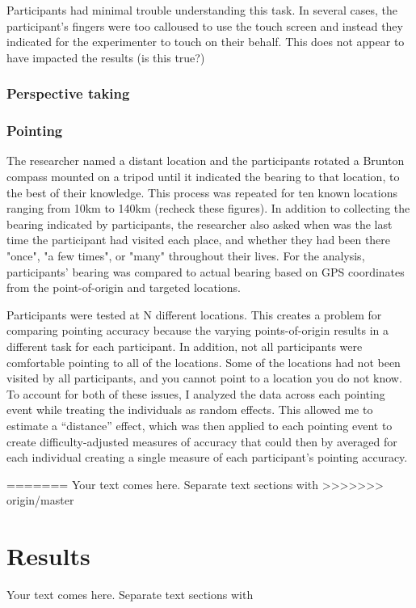 Participants had minimal trouble understanding this task.  In several cases, the participant's fingers were too calloused to use the touch screen and instead they indicated for the experimenter to touch on their behalf.  This does not appear to have impacted the results (is this true?)    

		\subsubsection{Perspective taking}
		\label{sec:2.2.3}					
		
		
		\subsubsection{Pointing}
		\label{sec:2.2.4}
The researcher named a distant location and the participants rotated a Brunton compass mounted on a tripod until it indicated the bearing to that location, to the best of their knowledge.  This process was repeated for ten known locations ranging from 10km to 140km (recheck these figures).  In addition to collecting the bearing indicated by participants, the researcher also asked when was the last time the participant had visited each place, and whether they had been there "once", "a few times", or "many" throughout their lives.  For the analysis, participants' bearing was compared to actual bearing based on GPS coordinates from the point-of-origin and targeted locations.   		

Participants were tested at N different locations.  This creates a problem for comparing pointing accuracy because the varying points-of-origin results in a different task for each participant.  In addition, not all participants were comfortable pointing to all of the locations.  Some of the locations had not been visited by all participants, and you cannot point to a location you do not know.  To account for both of these issues, I analyzed the data across each pointing event while treating the individuals as random effects.  This allowed me to estimate a ``distance'' effect, which was then applied to each pointing event to create difficulty-adjusted measures of accuracy that could then by averaged for each individual creating a single measure of each participant's pointing accuracy. 		
			


=======
Your text comes here. Separate text sections with
>>>>>>> origin/master

\section{Results}
\label{sec:3}
Your text comes here. Separate text sections with	

